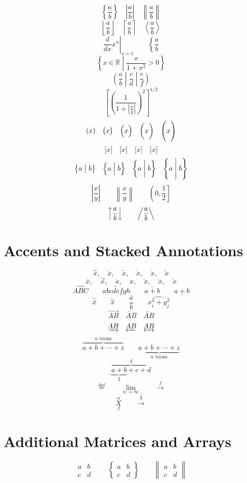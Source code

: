 \documentclass[12pt]{article}
\begin{document}
\[
\left\{\frac{a}{b}\right\} \quad \left|\frac{a}{b}\right|
\quad \left\|\frac{a}{b}\right\|
\]
\[
\left\lfloor\frac{a}{b}\right\rfloor
\quad \left\lceil\frac{a}{b}\right\rceil
\quad \left\langle\frac{a}{b}\right\rangle
\]
\[
\left.\frac{d}{dx}x^n\right|_{x=1}
\qquad \left\{\frac{a}{b}\right.
\]
\[
\left\{x\in\mathbb{R}\middle|\frac{x}{1+x^2}>0\right\}
\]
\[
\left(\frac{a}{b}\middle|\frac{c}{d}\middle|\frac{e}{f}\right)
\]
\[
\left[\left(\frac{1}{1+\left|\frac{x}{y}\right|}\right)^2\right]^{1/2}
\]
\[
(x)\quad \bigl(x\bigr)\quad \Bigl(x\Bigr)
\quad \biggl(x\biggr)\quad \Biggl(x\Biggr)
\]
\[
\big[x\big]\quad \Big[x\Big]\quad \bigg[x\bigg]\quad \Bigg[x\Bigg]
\]
\[
\bigl\{a\bigm|b\bigr\}\quad \Bigl\{a\Bigm|b\Bigr\}
\quad \biggl\{a\biggm|b\biggr\}\quad \Biggl\{a\Biggm|b\Biggr\}
\]
\[
\left\lvert\frac{x}{y}\right\rvert
\qquad \left\lVert\frac{x}{y}\right\rVert
\qquad \left(0,\frac{1}{2}\right]
\]
\[
\left\uparrow\frac{a}{b}\right\downarrow
\qquad \left/\frac{a}{b}\right\backslash
\]

\section{Accents and Stacked Annotations}

\[
\hat{x},\quad \check{x},\quad \tilde{x},\quad \acute{x},\quad \grave{x},\quad \breve{x}
\]
\[
\bar{x},\quad \vec{x},\quad \dot{x},\quad \ddot{x},\quad \dddot{x},\quad \ddddot{x},\quad \mathring{x}
\]
\[
\widehat{ABC} \qquad \widetilde{abcdefgh} \qquad \overline{a+b} \qquad \underline{a+b}
\]
\[
\hat{\bar{x}} \qquad \dot{\hat{x}} \qquad \overline{\frac{a}{b}}
\qquad \widehat{x_i^2+y_j^2}
\]
\[
\overrightarrow{AB} \quad \overleftarrow{AB} \quad \overleftrightarrow{AB}
\]
\[
\underrightarrow{AB} \quad \underleftarrow{AB} \quad \underleftrightarrow{AB}
\]
\[
\overbrace{a+b+\cdots+z}^{n\text{ terms}}
\qquad \underbrace{a+b+\cdots+z}_{n\text{ terms}}
\]
\[
\overbrace{\underbrace{a+b}_{2}+c+d}^{4}
\]
\[
\overset{\text{def}}{=} \qquad \underset{n\to\infty}{\lim}
\qquad \stackrel{f}{\longrightarrow}
\]
\[
\overset{\alpha}{\underset{\beta}{X}}
\qquad \overset{\frac{1}{n}}{\longrightarrow}
\]

\section{Additional Matrices and Arrays}

\[
\begin{matrix}a&b\\c&d\end{matrix}
\qquad \begin{Bmatrix}a&b\\c&d\end{Bmatrix}
\qquad \begin{Vmatrix}a&b\\c&d\end{Vmatrix}
\]
\end{document}

